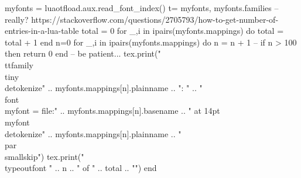 \documentclass{article}
\begin{document}
 
 \begin{luacode}
   myfonts = luaotfload.aux.read_font_index()
   t={ myfonts, myfonts.families }
   -- really? https://stackoverflow.com/questions/2705793/how-to-get-number-of-entries-in-a-lua-table 
   total = 0
   for _,i in ipairs(myfonts.mappings) do
     total = total + 1
   end
   n=0
   for _,i in ipairs(myfonts.mappings) do
     n = n + 1
     -- if n > 100 then return 0 end -- be patient...
     tex.print("\\ttfamily\\tiny\\detokenize{"  .. myfonts.mappings[n].plainname .. "}: " ..
       "\\font\\myfont = {file:" .. myfonts.mappings[n].basename .. "} at 14pt \\myfont \\detokenize{" ..
       myfonts.mappings[n].plainname .. "}\\par\\smallskip")
     tex.print("\\typeout{font " .. n .. " of " .. total .. "}")
   end
 \end{luacode}
 
\end{document}
